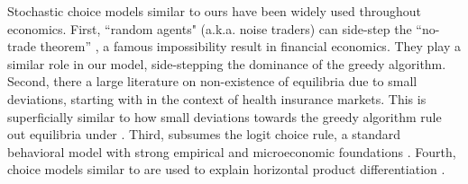 Stochastic choice models similar to ours have been widely used throughout economics. First, ``random agents" (a.k.a. noise traders) can side-step the ``no-trade theorem'' \citep{Milgrom-Stokey-82}, a famous impossibility result in financial economics. They play a similar role in our model, side-stepping the dominance of the greedy algorithm.
Second, there a large literature on non-existence of equilibria due to small deviations, starting with \cite{Rothschild-Stiglitz-76} in the context of health insurance markets.
This is superficially similar to how small deviations towards the greedy algorithm rule out equilibria under \HardMaxRandom.
Third, \SoftMaxRandom subsumes the logit choice rule, a standard behavioral model with strong empirical and microeconomic foundations
\citep[\eg][]{mosteller1951experimental, luce1959choice, mcfadden1974measurement, matvejka2015rational}.
Fourth, choice models similar to \SoftMaxRandom are used to explain  horizontal product differentiation \citep[\eg][]{Hotelling-29, Perloff-Salop-85}.


